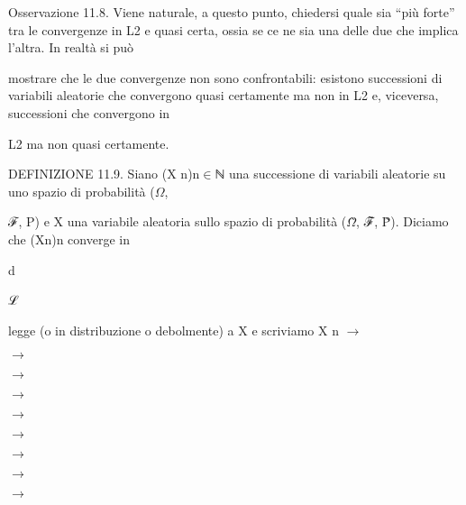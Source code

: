\documentclass[a4paper,portrait,12pt]{article}
\begin{document}
\begin{flushleft}
Osservazione 11.8. Viene naturale, a questo punto, chiedersi quale sia {``}più forte'' tra le convergenze in L2 e quasi certa, ossia se ce ne sia una delle due che implica l'altra. In realt\`{a} si pu\`{o}
\end{flushleft}


\begin{flushleft}
mostrare che le due convergenze non sono confrontabili: esistono successioni di variabili aleatorie che convergono quasi certamente ma non in L2 e, viceversa, successioni che convergono in
\end{flushleft}


\begin{flushleft}
L2 ma non quasi certamente.
\end{flushleft}


\begin{flushleft}
DEFINIZIONE 11.9. Siano (X n)n$\in$ℕ una successione di variabili aleatorie su uno spazio di probabilit\`{a} ($\Omega$,
\end{flushleft}


\begin{flushleft}
ℱ, P) e X una variabile aleatoria sullo spazio di probabilit\`{a} ($\Omega$̃, ℱ̃, P̃). Diciamo che (Xn)n converge in
\end{flushleft}


\begin{flushleft}
d
\end{flushleft}





\begin{flushleft}
ℒ
\end{flushleft}





\begin{flushleft}
legge (o in distribuzione o debolmente) a X e scriviamo X n $\rightarrow$
\end{flushleft}


$\rightarrow$


$\rightarrow$


$\rightarrow$


$\rightarrow$


$\rightarrow$


$\rightarrow$


$\rightarrow$


$\rightarrow$
\end{document}
